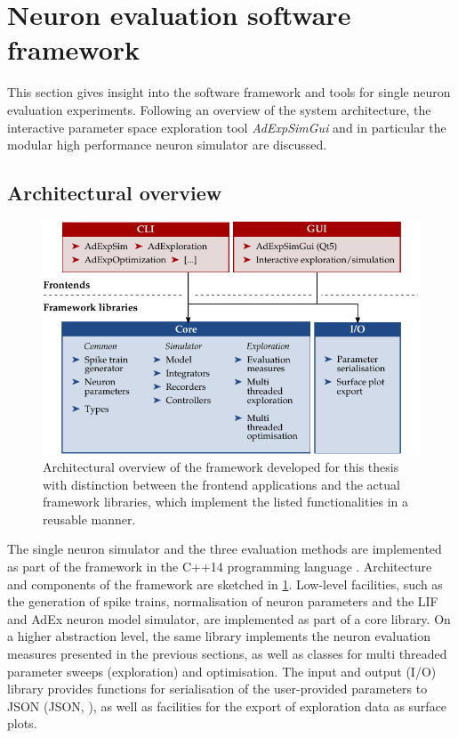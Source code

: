 \section{Neuron evaluation software framework}
\label{sec:adexpsim}

This section gives insight into the software framework and tools for single neuron evaluation experiments. Following an overview of the system architecture, the interactive parameter space exploration tool \emph{AdExpSimGui} and in particular the modular high performance neuron simulator are discussed.

\subsection{Architectural overview}

\begin{figure}
	\centering
	\includegraphics{media/chp4/adexpsim.pdf}
	\caption[Architectural overview of the AdExpSim framework]{Architectural overview of the \AdExpSim framework developed for this thesis with distinction between the frontend applications and the actual framework libraries, which implement the listed functionalities in a reusable manner.}
	\label{fig:adexpsim}
\end{figure}

The single neuron simulator and the three evaluation methods are implemented as part of the \AdExpSim framework in the C++14 programming language \cite{isocpp14}. Architecture and components of the framework are sketched in \cref{fig:adexpsim}. Low-level facilities, such as the generation of spike trains, normalisation of neuron parameters and the \acrshort{LIF} and \acrshort{AdEx} neuron model simulator, are implemented as part of a core library. On a higher abstraction level, the same library implements the neuron evaluation measures presented in the previous sections, as well as classes for multi threaded parameter sweeps (exploration) and optimisation. The input and output (I/O) library provides functions for serialisation of the user-provided parameters to \acrshort{JSON} (\acrlong{JSON}, \cite{json2014rfc}), as well as facilities for the export of exploration data as surface plots.


